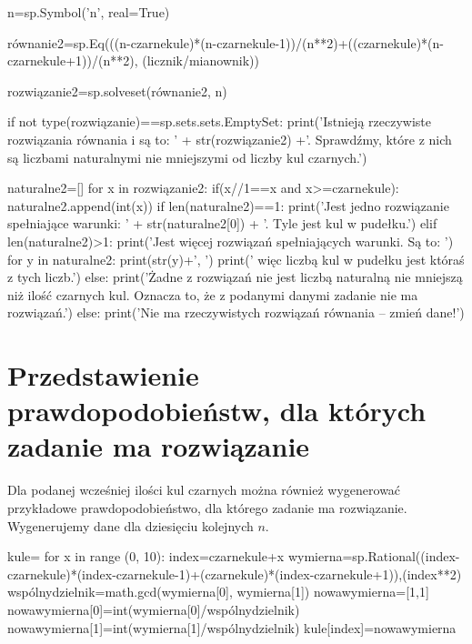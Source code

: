 \documentclass{mwart}
\begin{document}
\begin{pycode}
n=sp.Symbol('n', real=True)

równanie2=sp.Eq(((n-czarnekule)*(n-czarnekule-1))/(n**2)+((czarnekule)*(n-czarnekule+1))/(n**2), (licznik/mianownik))

rozwiązanie2=sp.solveset(równanie2, n)

if not type(rozwiązanie)==sp.sets.sets.EmptySet:
	print('Istnieją rzeczywiste rozwiązania równania i są to: ' + str(rozwiązanie2) +'. Sprawdźmy, które z nich są liczbami naturalnymi nie mniejszymi od liczby kul czarnych.')

	naturalne2=[]
	for x in rozwiązanie2:
		if(x//1==x and x>=czarnekule):
			naturalne2.append(int(x))
	if len(naturalne2)==1:
		print('Jest jedno rozwiązanie spełniające warunki: ' + str(naturalne2[0]) + '. Tyle jest kul w pudełku.')
	elif len(naturalne2)>1:
		print('Jest więcej rozwiązań spełniających warunki. Są to: ')
		for y in naturalne2:
			print(str(y)+', ')
		print(' więc liczbą kul w pudełku jest któraś z tych liczb.')
	else:
		print('Żadne z rozwiązań nie jest liczbą naturalną nie mniejszą niż ilość czarnych kul. Oznacza to, że z podanymi danymi zadanie nie ma rozwiązań.')
else:
	print('Nie ma rzeczywistych rozwiązań równania – zmień dane!')
\end{pycode}

\section{Przedstawienie prawdopodobieństw, dla których zadanie ma rozwiązanie}
Dla podanej wcześniej ilości kul czarnych można również wygenerować przykładowe prawdopodobieństwo, dla którego zadanie ma rozwiązanie. Wygenerujemy dane dla dziesięciu kolejnych $n$.

\begin{pycode}
kule={}
for x in range (0, 10):
	index=czarnekule+x
	wymierna=sp.Rational((index-czarnekule)*(index-czarnekule-1)+(czarnekule)*(index-czarnekule+1)),(index**2)
	wspólnydzielnik=math.gcd(wymierna[0], wymierna[1])
	nowawymierna=[1,1]
	nowawymierna[0]=int(wymierna[0]/wspólnydzielnik)
	nowawymierna[1]=int(wymierna[1]/wspólnydzielnik)
	kule[index]=nowawymierna
\end{pycode}
\end{document}
